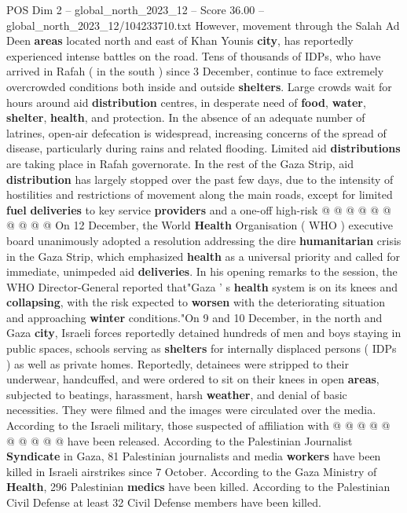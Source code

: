 \begin{textsample}{POS Dim 2 – global\_north\_2023\_12 – Score 36.00 – global\_north\_2023\_12/104233710.txt}
However, movement through the Salah Ad Deen \textbf{areas} located north and east of Khan Younis \textbf{city}, has reportedly experienced intense battles on the road.
Tens of thousands of IDPs, who have arrived in Rafah ( in the south ) since 3 December, continue to face extremely overcrowded conditions both inside and outside \textbf{shelters}.
Large crowds wait for hours around aid \textbf{distribution} centres, in desperate need of \textbf{food}, \textbf{water}, \textbf{shelter}, \textbf{health}, and protection.
In the absence of an adequate number of latrines, open-air defecation is widespread, increasing concerns of the spread of disease, particularly during rains and related flooding.
Limited aid \textbf{distributions} are taking place in Rafah governorate.
In the rest of the Gaza Strip, aid \textbf{distribution} has largely stopped over the past few days, due to the intensity of hostilities and restrictions of movement along the main roads, except for limited \textbf{fuel} \textbf{deliveries} to key service \textbf{providers} and a one-off high-risk @ @ @ @ @ @ @ @ @ @ On 12 December, the World \textbf{Health} Organisation ( WHO ) executive board unanimously adopted a resolution addressing the dire \textbf{humanitarian} crisis in the Gaza Strip, which emphasized \textbf{health} as a universal priority and called for immediate, unimpeded aid \textbf{deliveries}.
In his opening remarks to the session, the WHO Director-General reported that"Gaza ' s \textbf{health} system is on its knees and \textbf{collapsing}, with the risk expected to \textbf{worsen} with the deteriorating situation and approaching \textbf{winter} conditions."On 9 and 10 December, in the north and Gaza \textbf{city}, Israeli forces reportedly detained hundreds of men and boys staying in public spaces, schools serving as \textbf{shelters} for internally displaced persons ( IDPs ) as well as private homes.
Reportedly, detainees were stripped to their underwear, handcuffed, and were ordered to sit on their knees in open \textbf{areas}, subjected to beatings, harassment, harsh \textbf{weather}, and denial of basic necessities.
They were filmed and the images were circulated over the media.
According to the Israeli military, those suspected of affiliation with @ @ @ @ @ @ @ @ @ @ have been released.
According to the Palestinian Journalist \textbf{Syndicate} in Gaza, 81 Palestinian journalists and media \textbf{workers} have been killed in Israeli airstrikes since 7 October.
According to the Gaza Ministry of \textbf{Health}, 296 Palestinian \textbf{medics} have been killed.
According to the Palestinian Civil Defense at least 32 Civil Defense members have been killed.

\end{textsample}
